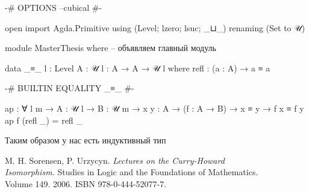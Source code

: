 \documentclass{article}[14pt]
\begin{document}
\begin{code}

{-# OPTIONS --cubical #-}

open import Agda.Primitive using (Level; lzero; lsuc; _⊔_)
                           renaming (Set to 𝒰)

module MasterThesis where -- объявляем главный модуль

data _≡_ {l : Level} {A : 𝒰 l} : A → A → 𝒰 l where
    refl : (a : A) → a ≡ a

{-# BUILTIN EQUALITY _≡_  #-}

ap : ∀ {l m} → {A : 𝒰 l} → {B : 𝒰 m} → {x y : A} 
     → (f : A → B) → x ≡ y → f x ≡ f y
ap f (refl _) = refl _

\end{code}

Таким образом у нас есть индуктивный тип 

\begin{thebibliography}{}
    M. H. Sorensen, P. Urzycyn. \textit{Lectures on the Curry-Howard \\ Isomorphism.}
    Studies in Logic and the Foundations of Mathematics. \\ Volume 149. 2006. ISBN
    978-0-444-52077-7.
\end{thebibliography}
\end{document}
